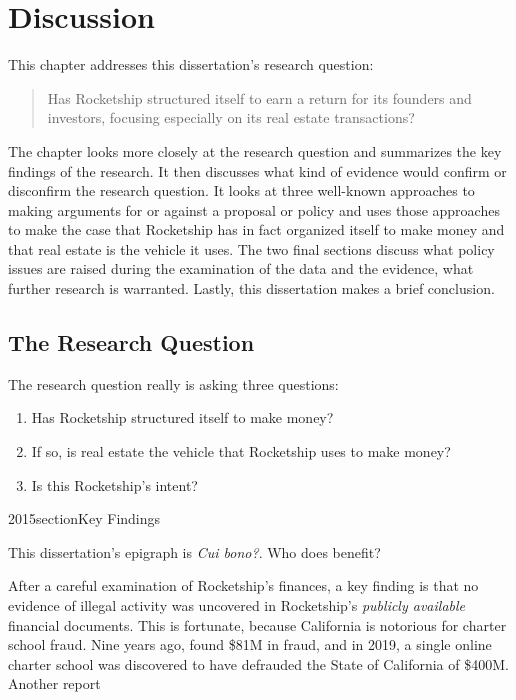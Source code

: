 
\chapter{Discussion}%
\label{ch:discussion}%
\noindent\bigskip%

This chapter addresses this dissertation's research question:
\medskip%
\begin{quote}\OnehalfSpacing
  Has Rocketship structured itself to earn a return for its founders and investors, focusing especially on its real estate transactions?
\end{quote}
The chapter looks more closely at the research question and summarizes the key findings of the research. It then discusses what kind of evidence would confirm or disconfirm the research question. It looks at three well-known approaches to making arguments for or against a proposal or policy and uses those approaches to make the case that Rocketship has in fact organized itself to make money and that real estate is the vehicle it uses. The two final sections discuss what policy issues are raised during the examination of the data and the evidence, what further research is warranted. Lastly, this dissertation makes a brief conclusion.

\section{The Research Question}%
\label{sec:research-question}\indent%

The research question really is asking three questions:
\begin{enumerate}
  \item Has Rocketship structured itself to make money?
  \item If so, is real estate the vehicle that Rocketship uses to make money?
  \item Is this Rocketship's intent?
\end{enumerate}

2015section{Key Findings}%
\label{sec:summary-key-findings}\indent%

This dissertation's epigraph is \textit{Cui bono?}. Who does benefit?

After a careful examination of Rocketship's finances, a key finding is that no evidence of illegal activity was uncovered in Rocketship's \textit{publicly available} financial documents. This is fortunate, because California is notorious for charter school fraud. Nine years ago, \textcite{CPD2015} found \$81M in fraud, and in 2019, a single online charter school was discovered to have defrauded the State of California of \$400M. Another report 

